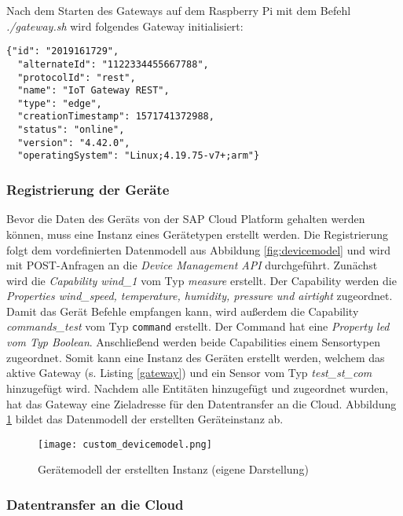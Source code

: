 \noindent Nach dem Starten des Gateways auf dem Raspberry Pi mit dem Befehl \textit{./gateway.sh} wird folgendes Gateway initialisiert:

\begin{lstlisting}[caption= Gateway-Eigenschaften, label=gateway]
  {"id": "2019161729",
  "alternateId": "1122334455667788",
  "protocolId": "rest",
  "name": "IoT Gateway REST",
  "type": "edge",
  "creationTimestamp": 1571741372988,
  "status": "online",
  "version": "4.42.0",
  "operatingSystem": "Linux;4.19.75-v7+;arm"}\end{lstlisting}

\subsubsection{Registrierung der Geräte}

Bevor die Daten des Geräts von der SAP Cloud Platform gehalten werden können, muss eine Instanz eines Gerätetypen erstellt werden. Die Registrierung folgt dem vordefinierten Datenmodell aus Abbildung \ref{fig:devicemodel} und wird mit POST-Anfragen an die \textit{Device Management API} durchgeführt. Zunächst wird die \textit{Capability wind\_1} vom Typ \textit{measure} erstellt. Der Capability werden die \textit{Properties wind\_speed, temperature, humidity, pressure und airtight} zugeordnet. Damit das Gerät Befehle empfangen kann, wird außerdem die Capability \textit{commands\_test} vom Typ \texttt{command} erstellt. Der Command hat eine \textit{Property led vom Typ Boolean}. Anschließend werden beide Capabilities einem Sensortypen zugeordnet. Somit kann eine Instanz des Geräten erstellt werden, welchem das aktive Gateway (s. Listing \ref{gateway}) und ein Sensor vom Typ \textit{test\_st\_com} hinzugefügt wird. Nachdem alle Entitäten hinzugefügt und zugeordnet wurden, hat das Gateway eine Zieladresse für den Datentransfer an die Cloud. Abbildung \ref{customdevicemodel} bildet das Datenmodell der erstellten Geräteinstanz ab.

\begin{figure} [H]
  \texttt{[image: custom\_devicemodel.png]}
  \caption[Gerätemodell der erstellten Instanz]{Gerätemodell der erstellten Instanz (eigene Darstellung)}
  \label{customdevicemodel}
\end{figure}
\newpage

\subsubsection{Datentransfer an die Cloud}

